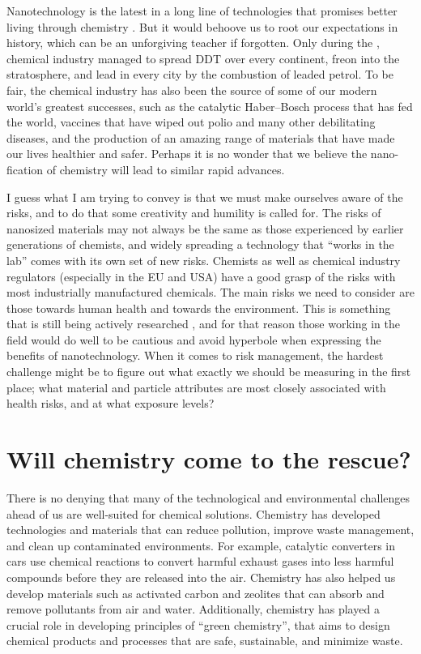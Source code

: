 \documentclass[draft,webedition,openright,titles,swedish,english]{LuaUUThesis}\usepackage[]{graphicx}\usepackage[]{xcolor}
\begin{document}
Nanotechnology is the latest in a long line of technologies that promises
better living through chemistry \cite{Schummer2008}.
But it would behoove us to root our expectations in history, which can
be an unforgiving teacher if forgotten. Only during the , chemical
industry managed to spread DDT over every continent, freon into the stratosphere,
and lead in every city by the combustion of leaded petrol.
To be fair, the chemical industry has also been the source of some
of our modern world's greatest successes, such as the catalytic Haber--Bosch
process that has fed the world, vaccines that have wiped out polio and many other
debilitating diseases, and the production of an amazing range of materials that
have made our lives healthier and safer.
Perhaps it is no wonder that we believe the nano-fication of chemistry
will lead to similar rapid advances.

I guess what I am trying to convey is that we must make ourselves aware of the
risks, and to do that some creativity and humility is called for.
The risks of nanosized materials may not always be the same as those experienced
by earlier generations of chemists, and widely spreading a technology that
\enquote{works in the lab} comes with its own set of new risks.
Chemists as well as chemical industry regulators (especially in the
EU and USA) have a good grasp of the risks with most industrially manufactured
chemicals.
The main risks we need to consider are those towards human health and towards the environment.
This is something that is still being actively researched
\cite{Mitchell2019,Kim2016a,Reed2012,Maynard2011}, and for that reason those working
in the field would do well to be cautious and avoid hyperbole when expressing the
benefits of nanotechnology.
When it comes to risk management, the hardest challenge might be to figure out
what exactly we should be measuring in the first place; what material
and particle attributes are most closely associated with health risks, and at what
exposure levels? \cite{Maynard2015}





\section{Will chemistry come to the rescue?}
\label{intro:chemistry-rescue}

There is no denying that many of the technological and environmental challenges
ahead of us are well-suited for chemical solutions.
Chemistry has developed technologies and materials that can reduce pollution,
improve waste management, and clean up contaminated environments.
For example, catalytic converters in cars use chemical reactions to convert harmful
exhaust gases into less harmful compounds before they are released into the air.
Chemistry has also helped us develop materials such as activated carbon and zeolites that
can absorb and remove pollutants from air and water.
Additionally, chemistry has played a crucial role in developing principles of
\enquote{green chemistry}, that aims to design chemical products and processes
that are safe, sustainable, and minimize waste.
\end{document}
